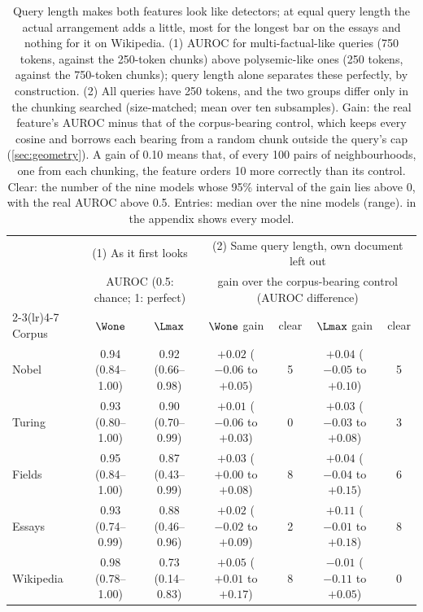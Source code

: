\begin{table}[t]
\centering
\small
\setlength{\tabcolsep}{4pt}
\begin{tabular}{lcc@{\hspace{14pt}}cccc}
\toprule
 & \multicolumn{2}{c}{(1) As it first looks} & \multicolumn{4}{c}{(2) Same query length, own document left out} \\
 & \multicolumn{2}{c}{\scriptsize AUROC (0.5: chance; 1: perfect)} & \multicolumn{4}{c}{\scriptsize gain over the corpus-bearing control (AUROC difference)} \\
\cmidrule(lr){2-3}\cmidrule(lr){4-7}
Corpus & $\Wone$ & $\Lmax$ & $\Wone$ gain & clear & $\Lmax$ gain & clear \\
\midrule
Nobel & 0.94 {\scriptsize(0.84--1.00)} & 0.92 {\scriptsize(0.66--0.98)} & $+0.02$ {\scriptsize($-0.06$ to $+0.05$)} & 5 & $+0.04$ {\scriptsize($-0.05$ to $+0.10$)} & 5 \\
Turing & 0.93 {\scriptsize(0.80--1.00)} & 0.90 {\scriptsize(0.70--0.99)} & $+0.01$ {\scriptsize($-0.06$ to $+0.03$)} & 0 & $+0.03$ {\scriptsize($-0.03$ to $+0.08$)} & 3 \\
Fields & 0.95 {\scriptsize(0.84--1.00)} & 0.87 {\scriptsize(0.43--0.99)} & $+0.03$ {\scriptsize($+0.00$ to $+0.08$)} & 8 & $+0.04$ {\scriptsize($-0.04$ to $+0.15$)} & 6 \\
Essays & 0.93 {\scriptsize(0.74--0.99)} & 0.88 {\scriptsize(0.46--0.96)} & $+0.02$ {\scriptsize($-0.02$ to $+0.09$)} & 2 & $+0.11$ {\scriptsize($-0.01$ to $+0.18$)} & 8 \\
Wikipedia & 0.98 {\scriptsize(0.78--1.00)} & 0.73 {\scriptsize(0.14--0.83)} & $+0.05$ {\scriptsize($+0.01$ to $+0.17$)} & 8 & $-0.01$ {\scriptsize($-0.11$ to $+0.05$)} & 0 \\
\bottomrule
\end{tabular}
\caption{Query length makes both features look like detectors; at equal query length the actual arrangement adds a little, most for the longest bar on the essays and nothing for it on Wikipedia. (1) AUROC for multi-factual-like queries (750 tokens, against the 250-token chunks) above polysemic-like ones (250 tokens, against the 750-token chunks); query length alone separates these perfectly, by construction. (2) All queries have 250 tokens, and the two groups differ only in the chunking searched (size-matched; mean over ten subsamples). Gain: the real feature's AUROC minus that of the corpus-bearing control, which keeps every cosine and borrows each bearing from a random chunk outside the query's cap (\cref{sec:geometry}). A gain of 0.10 means that, of every 100 pairs of neighbourhoods, one from each chunking, the feature orders 10 more correctly than its control. Clear: the number of the nine models whose 95\% interval of the gain lies above 0, with the real AUROC above 0.5. Entries: median over the nine models (range).  in the appendix shows every model.}
\label{tab:real}
\end{table}
